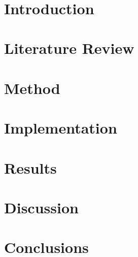 \documentclass[en, openany, final, 12pt, oneside]{mgr}
\title{ }
\author{ }
\begin{document}



\tableofcontents
\chapter{Introduction}

\chapter{Literature Review}

\chapter{Method}

\chapter{Implementation}

\chapter{Results}

\chapter{Discussion}

\chapter{Conclusions}


\cleardoublepage
{}

\end{document}
